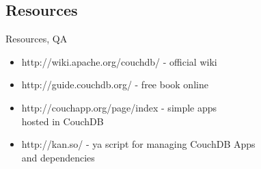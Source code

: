 \documentclass{beamer}
\begin{document}
\subsection{Resources}
\begin{frame}{Resources, QA}
  \begin{itemize}
    \item http://wiki.apache.org/couchdb/ - official wiki
    \item http://guide.couchdb.org/ - free book online
    \item http://couchapp.org/page/index - simple apps\\hosted in CouchDB
    \item http://kan.so/ - ya script for managing CouchDB Apps\\and dependencies
  \end{itemize}
\end{frame}
\end{document}
